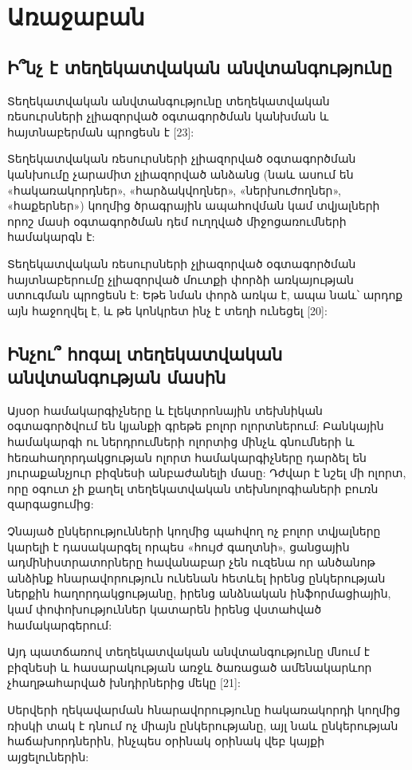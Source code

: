 \documentclass[a4paper,12pt]{article}
\begin{document}
\begin{sloppypar}
\section{Առաջաբան}


\subsection{Ի՞նչ է տեղեկատվական անվտանգությունը}

Տեղեկատվական անվտանգությունը տեղեկատվական ռեսուրսների չլիազորված օգտագործման
կանխման և հայտնաբերման պրոցեսն է [23]:

Տեղեկատվական ռեսուրսների չլիազորված օգտագործման
կանխումը չարամիտ չլիազորված անձանց (նաև ասում են «հակառակորդներ»,
«հարձակվողներ», «ներխուժողներ», «հաքերներ») կողմից ծրագրային ապահովման կամ
տվյալների որոշ մասի օգտագործման դեմ ուղղված միջոցառումների համակարգն է:

Տեղեկատվական ռեսուրսների չլիազորված օգտագործման
հայտնաբերումը չլիազորված մուտքի փորձի առկայության ստուգման պրոցեսն է: Եթե
նման փորձ առկա է, ապա նաև՝ արդոք այն հաջողվել է, և թե կոնկրետ ինչ է տեղի
ունեցել [20]:

\subsection{Ինչու՞ հոգալ տեղեկատվական անվտանգության մասին}

Այսօր համակարգիչները և էլեկտրոնային տեխնիկան օգտագործվում են
կյանքի գրեթե բոլոր ոլորտներում: Բանկային համակարգի ու ներդրումների ոլորտից
մինչև գնումների և հեռահաղորդակցության ոլորտ համակարգիչները դարձել են
յուրաքանչյուր բիզնեսի անբաժանելի մասը: Դժվար է նշել մի ոլորտ, որը
օգուտ չի քաղել տեղեկատվական տեխնոլոգիաների բուռն զարգացումից:

Չնայած ընկերությունների կողմից պահվող ոչ բոլոր տվյալները կարելի է
դասակարգել որպես «հույժ գաղտնի», ցանցային ադմինիստրատորները հավանաբար
չեն ուզենա որ անծանոթ անձինք հնարավորություն ունենան հետևել
իրենց ընկերության ներքին հաղորդակցությանը,
իրենց անձնական ինֆորմացիային, կամ փոփոխություններ կատարեն իրենց վստահված
համակարգերում:

Այդ պատճառով տեղեկատվական անվտանգությունը մնում է բիզնեսի և հասարակության
առջև ծառացած ամենակարևոր չհաղթահարված խնդիրներից մեկը [21]:

Սերվերի ղեկավարման հնարավորությունը հակառակորդի կողմից ռիսկի տակ է
դնում ոչ միայն ընկերությանը, այլ նաև ընկերության հաճախորդներին, ինչպես օրինակ
օրինակ վեբ կայքի այցելուներին:



\end{sloppypar}
\end{document}
